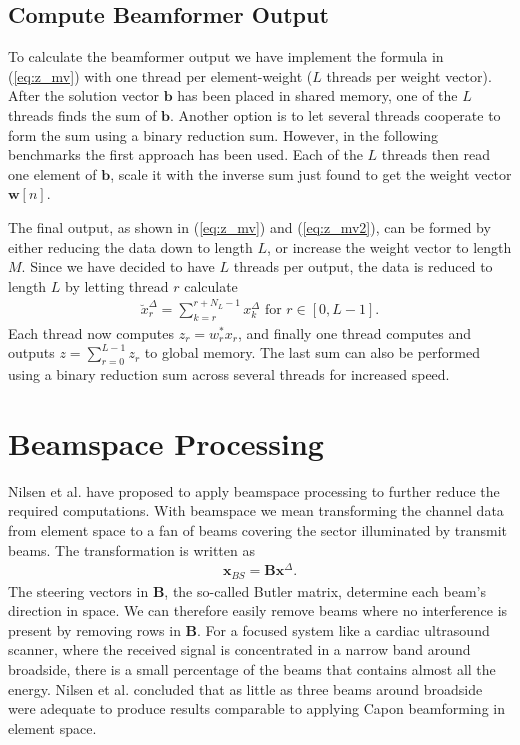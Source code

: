 \documentclass[journal]{IEEEtran}
\newcommand{\mat}[1]{\mathbf{#1}}
\renewcommand{\vec}[1]{\mathbf{#1}}
\begin{document}
\subsection{Compute Beamformer Output}
To calculate the beamformer output we have implement the formula in (\ref{eq:z_mv}) with one thread per element-weight ($L$ threads per weight vector). After the solution vector $\vec{b}$ has been placed in shared memory, one of the $L$ threads finds the sum of $\vec{b}$. Another option is to let several threads cooperate to form the sum using a binary reduction sum. However, in the following benchmarks the first approach has been used. Each of the $L$ threads then read one element of $\vec{b}$, scale it with the inverse sum just found to get the weight vector $\vec{w}[n]$. 

The final output, as shown in (\ref{eq:z_mv}) and (\ref{eq:z_mv2}), can be formed by either reducing the data down to length $L$, or increase the weight vector to length $M$. Since we have decided to have $L$ threads per output, the data is reduced to length $L$ by letting thread $r$ calculate 
\begin{align}
\breve{x}_{r}^{\Delta} = \sum_{k=r}^{r+N_L-1}x_{k}^{\Delta} \text{ for } r \in [0, L-1].
\end{align}
Each thread now computes $z_r = w_r^*x_r$, and finally one thread computes and outputs $z = \sum_{r=0}^{L-1} z_r$ to global memory. The last sum can also be performed using a binary reduction sum across several threads for increased speed.

\section{Beamspace Processing}\label{sec:bs}
Nilsen et al. \cite{Nilsen2009} have proposed to apply beamspace processing to further reduce the required computations. With beamspace we mean transforming the channel data from element space to a fan of beams covering the sector illuminated by transmit beams. The transformation is written as
\begin{align}
\vec{x}_{BS} = \mat{B}\vec{x}^{\Delta}.
\end{align} 
The steering vectors in $\mat{B}$, the so-called Butler matrix, determine each beam's direction in space. We can therefore easily remove beams where no interference is present by removing rows in $\mat{B}$. For a focused system like a cardiac ultrasound scanner, where the received signal is concentrated in a narrow band around broadside, there is a small percentage of the beams that contains almost all the energy. Nilsen et al. concluded that as little as three beams around broadside were adequate to produce results comparable to applying Capon beamforming in element space. 
\end{document}
